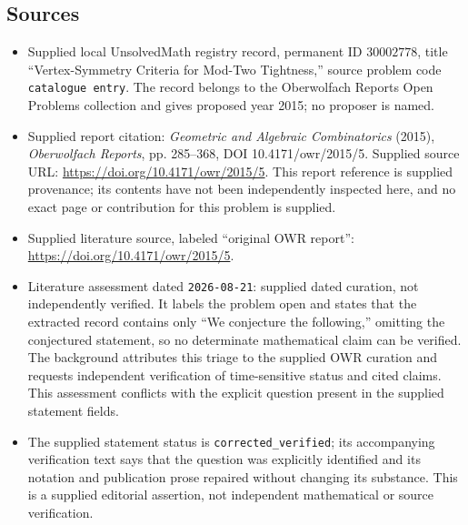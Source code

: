 \documentclass[11pt]{article}
\begin{document}
\subsection{Sources}
\begin{itemize}
\item Supplied local UnsolvedMath registry record, permanent ID \(30002778\), title ``Vertex-Symmetry Criteria for Mod-Two Tightness,'' source problem code \texttt{catalogue entry}. The record belongs to the Oberwolfach Reports Open Problems collection and gives proposed year 2015; no proposer is named.
\item Supplied report citation: \emph{Geometric and Algebraic Combinatorics} (2015), \emph{Oberwolfach Reports}, pp. 285--368, DOI 10.4171/owr/2015/5. Supplied source URL: \url{https://doi.org/10.4171/owr/2015/5}. This report reference is supplied provenance; its contents have not been independently inspected here, and no exact page or contribution for this problem is supplied.
\item Supplied literature source, labeled ``original OWR report'': \url{https://doi.org/10.4171/owr/2015/5}.
\item Literature assessment dated \texttt{2026-08-21}: supplied dated curation, not independently verified. It labels the problem open and states that the extracted record contains only ``We conjecture the following,'' omitting the conjectured statement, so no determinate mathematical claim can be verified. The background attributes this triage to the supplied OWR curation and requests independent verification of time-sensitive status and cited claims. This assessment conflicts with the explicit question present in the supplied statement fields.
\item The supplied statement status is \texttt{corrected\_verified}; its accompanying verification text says that the question was explicitly identified and its notation and publication prose repaired without changing its substance. This is a supplied editorial assertion, not independent mathematical or source verification.
\end{itemize}
\end{document}
